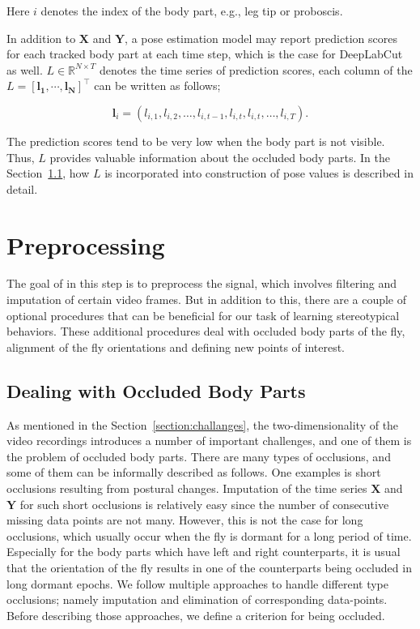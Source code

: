 Here $i$ denotes the index of the body part, e.g., leg tip or proboscis.

In addition to $\mathbf{X}$ and $\mathbf{Y}$, a pose estimation model may report prediction scores for each tracked body part at each time step, which is the case for DeepLabCut as well.
$L \in \mathbb{R}^{N \times T}$ denotes the time series of prediction scores, each column of the $L=[\mathbf{l_1}, \cdots, \mathbf{l_N}]^\top$ can be written as follows;

\begin{equation*}
	\mathbf{l}_i = (l_{i,1}, l_{i,2}, \dots, l_{i,t-1}, l_{i,t}, l_{i,t}, \dots, l_{i,T}).
\end{equation*}

The prediction scores tend to be very low when the body part is not visible.
Thus, $L$ provides valuable information about the occluded body parts.
In the Section~\ref{section:dealing-with-occluded-body-parts}, how $L$ is incorporated into construction of pose values is described in detail.

\section{Preprocessing}
The goal of in this step is to preprocess the signal, which involves filtering and imputation of certain video frames.
But in addition to this, there are a couple of optional procedures that can be beneficial for our task of learning stereotypical behaviors.
These additional procedures deal with occluded body parts of the fly, alignment of the fly orientations and defining new points of interest.

\subsection{Dealing with Occluded Body Parts}\label{section:dealing-with-occluded-body-parts}
As mentioned in the Section~\ref{section:challanges}, the two-dimensionality of the video recordings introduces a number of important challenges, and one of them is the problem of occluded body parts.
There are many types of occlusions, and some of them can be informally described as follows.
One examples is short occlusions resulting from postural changes.
Imputation of the time series $\mathbf{X}$ and $\mathbf{Y}$ for such short occlusions is relatively easy since the number of consecutive missing data points are not many.
However, this is not the case for long occlusions, which usually occur when the fly is dormant for a long period of time.
Especially for the body parts which have left and right counterparts, it is usual that the orientation of the fly results in one of the counterparts being occluded in long dormant epochs.
We follow multiple approaches to handle different type occlusions; namely imputation and elimination of corresponding data-points.
Before describing those approaches, we define a criterion for being occluded.

